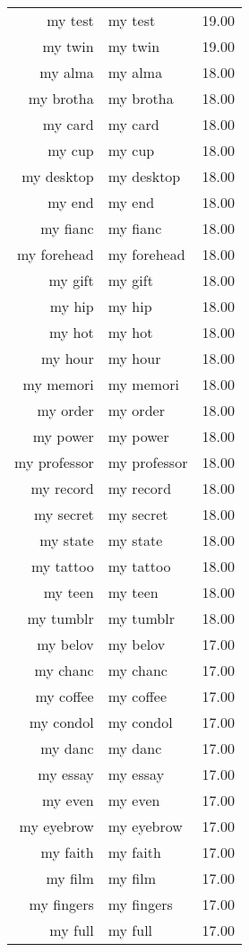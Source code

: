 \begin{table}[ht]
\begin{tabular}{rlr}
  my test & my test & 19.00 \\ 
  my twin & my twin & 19.00 \\ 
  my alma & my alma & 18.00 \\ 
  my brotha & my brotha & 18.00 \\ 
  my card & my card & 18.00 \\ 
  my cup & my cup & 18.00 \\ 
  my desktop & my desktop & 18.00 \\ 
  my end & my end & 18.00 \\ 
  my fianc & my fianc & 18.00 \\ 
  my forehead & my forehead & 18.00 \\ 
  my gift & my gift & 18.00 \\ 
  my hip & my hip & 18.00 \\ 
  my hot & my hot & 18.00 \\ 
  my hour & my hour & 18.00 \\ 
  my memori & my memori & 18.00 \\ 
  my order & my order & 18.00 \\ 
  my power & my power & 18.00 \\ 
  my professor & my professor & 18.00 \\ 
  my record & my record & 18.00 \\ 
  my secret & my secret & 18.00 \\ 
  my state & my state & 18.00 \\ 
  my tattoo & my tattoo & 18.00 \\ 
  my teen & my teen & 18.00 \\ 
  my tumblr & my tumblr & 18.00 \\ 
  my belov & my belov & 17.00 \\ 
  my chanc & my chanc & 17.00 \\ 
  my coffee & my coffee & 17.00 \\ 
  my condol & my condol & 17.00 \\ 
  my danc & my danc & 17.00 \\ 
  my essay & my essay & 17.00 \\ 
  my even & my even & 17.00 \\ 
  my eyebrow & my eyebrow & 17.00 \\ 
  my faith & my faith & 17.00 \\ 
  my film & my film & 17.00 \\ 
  my fingers & my fingers & 17.00 \\ 
  my full & my full & 17.00 \\ 

\end{tabular}
\end{table}
